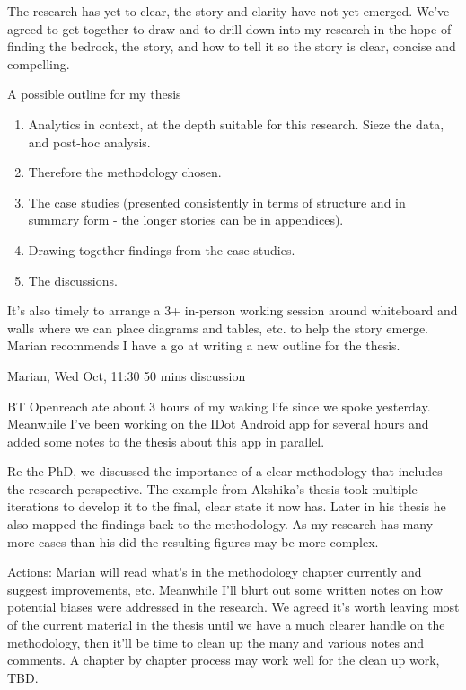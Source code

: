 The research has yet to clear, the story and clarity have not yet emerged. We've agreed to get together to draw and to drill down into my research in the hope of finding the bedrock, the story, and how to tell it so the story is clear, concise and compelling.

A possible outline for my thesis
\begin{enumerate}
    \item Analytics in context, at the depth suitable for this research. Sieze the data, and post-hoc analysis. 
    \item Therefore the methodology chosen.
    \item The case studies (presented consistently in terms of structure and in summary form - the longer stories can be in appendices).
    \item Drawing together findings from the case studies.
    \item The discussions. 
\end{enumerate}

It's also timely to arrange a 3+ in-person working session around whiteboard and walls where we can place diagrams and tables, etc. to help the story emerge. 
Marian recommends I have a go at writing a new outline for the thesis. 

\dotfill
Marian, Wed  Oct, 11:30 50 mins discussion

BT Openreach ate about 3 hours of my waking life since we spoke yesterday. Meanwhile I've been working on the IDot Android app for several hours and added some notes to the thesis about this app in parallel.

Re the PhD, we discussed the importance of a clear methodology that includes the research perspective. The example from Akshika's thesis took multiple iterations to develop it to the final, clear state it now has. Later in his thesis he also mapped the findings back to the methodology. As my research has many more cases than his did the resulting figures may be more complex. 

Actions: Marian will read what's in the methodology chapter currently and suggest improvements, etc. Meanwhile I'll blurt out some written notes on how potential biases were addressed in the research. We agreed it's worth leaving most of the current material in the thesis until we have a much clearer handle on the methodology, then it'll be time to clean up the many and various notes and comments. A chapter by chapter process may work well for the clean up work, TBD.

